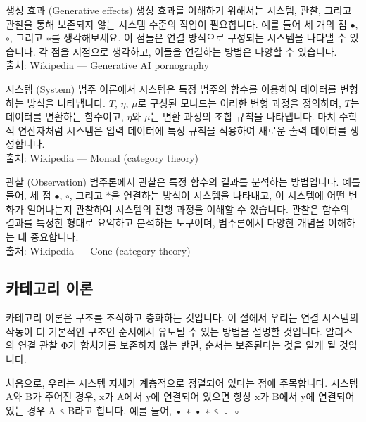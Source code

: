 \documentclass[11pt, a4paper, twoside, openany]{book}
\begin{document}
\begin{deepresearch}{생성 효과 (Generative effects)}
생성 효과를 이해하기 위해서는 시스템, 관찰, 그리고 관찰을 통해 보존되지 않는 시스템 수준의 작업이 필요합니다. 예를 들어 세 개의 점 $\bullet$, $\circ$, 그리고 $∗$를 생각해보세요. 이 점들은 연결 방식으로 구성되는 시스템을 나타낼 수 있습니다.  각 점을 지점으로 생각하고, 이들을 연결하는 방법은 다양할 수 있습니다.
\\[4pt]{\footnotesize\color{ctgray} 출처: Wikipedia — Generative AI pornography}
\end{deepresearch}

\begin{deepresearch}{시스템 (System)}
범주 이론에서 시스템은 특정 범주의 함수를 이용하여 데이터를 변형하는 방식을 나타냅니다.  $T$, $\eta$, $\mu$로 구성된 모나드는 이러한 변형 과정을 정의하며, $T$는 데이터를 변환하는 함수이고, $\eta$와 $\mu$는 변환 과정의 조합 규칙을 나타냅니다. 마치 수학적 연산자처럼 시스템은 입력 데이터에 특정 규칙을 적용하여 새로운 출력 데이터를 생성합니다.
\\[4pt]{\footnotesize\color{ctgray} 출처: Wikipedia — Monad (category theory)}
\end{deepresearch}

\begin{deepresearch}{관찰 (Observation)}
범주론에서 관찰은 특정 함수의 결과를 분석하는 방법입니다. 예를 들어, 세 점 $\bullet$, $\circ$, 그리고 $*$을 연결하는 방식이 시스템을 나타내고, 이 시스템에 어떤 변화가 일어나는지 관찰하여 시스템의 진행 과정을 이해할 수 있습니다.  관찰은 함수의 결과를 특정한 형태로 요약하고 분석하는 도구이며, 범주론에서 다양한 개념을 이해하는 데 중요합니다.
\\[4pt]{\footnotesize\color{ctgray} 출처: Wikipedia — Cone (category theory)}
\end{deepresearch}


\subsection{카테고리 이론}
\label{sec:1-1-2}

카테고리 이론은 구조를 조직하고 층화하는 것입니다. 이 절에서 우리는 연결 시스템의 작동이 더 기본적인 구조인 순서에서 유도될 수 있는 방법을 설명할 것입니다. 알리스의 연결 관찰 Φ가 합치기를 보존하지 않는 반면, 순서는 보존된다는 것을 알게 될 것입니다.

\par\medskip
처음으로, 우리는 시스템 자체가 계층적으로 정렬되어 있다는 점에 주목합니다. 시스템 A\hspace{0pt}와 B\hspace{0pt}가 주어진 경우, x\hspace{0pt}가 A\hspace{0pt}에서 y\hspace{0pt}에 연결되어 있으면 항상 x\hspace{0pt}가 B\hspace{0pt}에서 y\hspace{0pt}에 연결되어 있는 경우 A ≤ B\hspace{0pt}라고 합니다. 예를 들어,
•
∗
•
∗
≤
◦
◦
\end{document}
